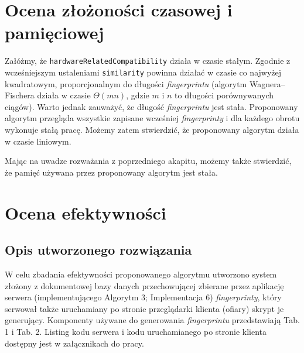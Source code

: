 \section{Ocena złożoności czasowej i pamięciowej}
Załóżmy, że \texttt{hardwareRelatedCompatibility} działa w czasie stałym.
Zgodnie z wcześniejszym ustaleniami \texttt{similarity} powinna działać w czasie
co najwyżej kwadratowym, proporcjonalnym do długości \emph{fingerprintu}
(algorytm Wagnera--Fischera działa w czasie \(\Theta(mn)\), gdzie \(m\) i \(n\)
to długości porównywanych ciągów). Warto jednak zauważyć, że długość
\emph{fingerprintu} jest stała. Proponowany algorytm przegląda wszystkie
zapisane wcześniej \emph{fingerprinty} i dla każdego obrotu wykonuje stałą
pracę. Możemy zatem stwierdzić, że proponowany algorytm działa w czasie
liniowym.

Mając na uwadze rozważania z poprzedniego akapitu, możemy także stwierdzić, że
pamięć używana przez proponowany algorytm jest stała.

\section{Ocena efektywności}

\subsection{Opis utworzonego rozwiązania}
W celu zbadania efektywności proponowanego algorytmu utworzono system złożony z
dokumentowej bazy danych przechowującej zbierane przez aplikację serwera
(implementującego Algorytm 3; Implementacja 6) \emph{fingerprinty}, który
serwował także uruchamiany po stronie przeglądarki klienta (ofiary) skrypt je
generujący. Komponenty używane do generowania \emph{fingerprintu} przedstawiają
Tab. 1 i Tab. 2. Listing kodu serwera i kodu uruchamianego po stronie klienta
dostępny jest w załącznikach do pracy.

